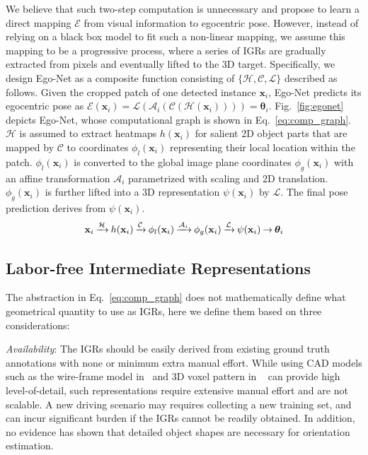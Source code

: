 \documentclass[final]{cvpr}
\begin{document}
We believe that such two-step computation is unnecessary and propose to learn a direct mapping $\mathcal{E}$ from visual information to egocentric pose. However, instead of relying on a black box model to fit such a non-linear mapping, we assume this mapping to be a progressive process, where a series of IGRs are gradually extracted from pixels and eventually lifted to the 3D target. Specifically, we design Ego-Net as a composite function consisting of $\{\mathcal{H},\mathcal{C}, \mathcal{L}\}$ described as follows. Given the cropped patch of one detected instance $\mathbf{x}_i$, Ego-Net predicts its egocentric pose as $\mathcal{E}(\mathbf{x}_i) = \mathcal{L}(\mathcal{A}_i(\mathcal{C}(\mathcal{H}(\mathbf{x}_i)))) =  \bm{\theta}_i$. Fig.~\ref{fig:egonet} depicts Ego-Net, whose computational graph is shown in Eq.~\ref{eq:comp_graph}. $\mathcal{H}$ is assumed to extract heatmaps $h(\mathbf{x}_i)$ for salient 2D object parts that are mapped by $\mathcal{C}$ to coordinates $\phi_l(\mathbf{x}_i)$ representing their local location within the patch. $\phi_l(\mathbf{x}_i)$ is converted to the global image plane coordinates $\phi_g(\mathbf{x}_i)$ with an affine transformation $\mathcal{A}_i$ parametrized with scaling and 2D translation. $\phi_g(\mathbf{x}_i)$ is further lifted into a 3D representation $\psi(\mathbf{x}_i)$ by $\mathcal{L}$. The final pose prediction derives from $\psi(\mathbf{x}_i)$.        
\begin{equation}
\label{eq:comp_graph}
\arraycolsep=1pt
\begin{array}{lllllllllll}
\mathbf{x}_i  & \xrightarrow{\mathcal{H}} & h(\mathbf{x}_i) & \xrightarrow{\mathcal{C}} & \phi_l(\mathbf{x}_i) & \xrightarrow{\mathcal{A}_i} & \phi_g(\mathbf{x}_i) & \xrightarrow{\mathcal{L}} & \psi(\mathbf{x}_i)  & \rightarrow & \bm{\theta}_i
\end{array}
\end{equation} 


\subsection{Labor-free Intermediate Representations}
The abstraction in Eq.~\ref{eq:comp_graph} does not mathematically define what geometrical quantity to use as IGRs, here we define them based on three considerations:

\noindent \emph{Availability}: The IGRs should be easily derived from existing ground truth annotations with none or minimum extra manual effort. While using CAD models such as the wire-frame model in~\cite{chabot2017deep} and 3D voxel pattern in ~\cite{xiang2015data} can provide high level-of-detail, such representations require extensive manual effort and are not scalable. A new driving scenario may requires collecting a new training set, and can incur significant burden if the IGRs cannot be readily obtained. In addition, no evidence has shown that detailed object shapes are necessary for orientation estimation.
\end{document}
